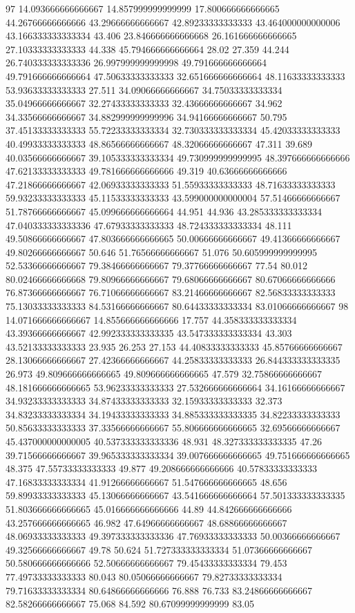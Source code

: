 97 14.093666666666667 14.857999999999999 17.800666666666665 44.26766666666666 43.29666666666667 42.89233333333333 43.464000000000006 43.166333333333334 43.406 23.846666666666668 26.161666666666665 27.10333333333333 44.338 45.794666666666664 28.02 27.359 44.244 26.740333333333336 26.997999999999998 49.791666666666664 49.791666666666664 47.50633333333333 32.651666666666664 48.11633333333333 53.93633333333333 27.511 34.09066666666667 34.75033333333334 35.04966666666667 32.27433333333333 32.43666666666667 34.962 34.33566666666667 34.882999999999996 34.94166666666667 50.795 37.45133333333333 55.72233333333334 32.730333333333334 45.42033333333333 40.49933333333333 48.86566666666667 48.32066666666667 47.311 39.689 40.03566666666667 39.105333333333334 49.730999999999995 48.397666666666666 47.62133333333333 49.781666666666666 49.319 40.63666666666666 47.21866666666667 42.06933333333333 51.55933333333333 48.71633333333333 59.93233333333333 45.11533333333333 43.599000000000004 57.51466666666667 51.78766666666667 45.099666666666664 44.951 44.936 43.285333333333334 47.040333333333336 47.67933333333333 48.724333333333334 48.111 49.50866666666667 47.803666666666665 50.00666666666667 49.41366666666667 49.80266666666667 50.646 51.76566666666667 51.076 50.605999999999995 52.53366666666667 79.38466666666667 79.37766666666667 77.54 80.012 80.02466666666668 79.80966666666667 79.68066666666667 80.67066666666666 76.87366666666667 76.71066666666667 83.21466666666667 82.56833333333333 75.13033333333333 84.53166666666667 80.64433333333334 83.01066666666667
98 14.071666666666667 14.855666666666666 17.757 44.358333333333334 43.39366666666667 42.992333333333335 43.547333333333334 43.303 43.52133333333333 23.935 26.253 27.153 44.40833333333333 45.85766666666667 28.13066666666667 27.42366666666667 44.25833333333333 26.844333333333335 26.973 49.809666666666665 49.809666666666665 47.579 32.75866666666667 48.181666666666665 53.96233333333333 27.532666666666664 34.16166666666667 34.93233333333333 34.87433333333333 32.15933333333333 32.373 34.83233333333334 34.19433333333333 34.885333333333335 34.82233333333333 50.85633333333333 37.33566666666667 55.806666666666665 32.69566666666667 45.437000000000005 40.537333333333336 48.931 48.327333333333335 47.26 39.71566666666667 39.965333333333334 39.007666666666665 49.751666666666665 48.375 47.55733333333333 49.877 49.208666666666666 40.57833333333333 47.16833333333334 41.91266666666667 51.547666666666665 48.656 59.89933333333333 45.13066666666667 43.541666666666664 57.501333333333335 51.803666666666665 45.016666666666666 44.89 44.842666666666666 43.257666666666665 46.982 47.64966666666667 48.68866666666667 48.06933333333333 49.397333333333336 47.76933333333333 50.00366666666667 49.32566666666667 49.78 50.624 51.727333333333334 51.07366666666667 50.580666666666666 52.50666666666667 79.45433333333334 79.453 77.49733333333333 80.043 80.05066666666667 79.82733333333334 79.71633333333334 80.64866666666666 76.888 76.733 83.24866666666667 82.58266666666667 75.068 84.592 80.67099999999999 83.05
